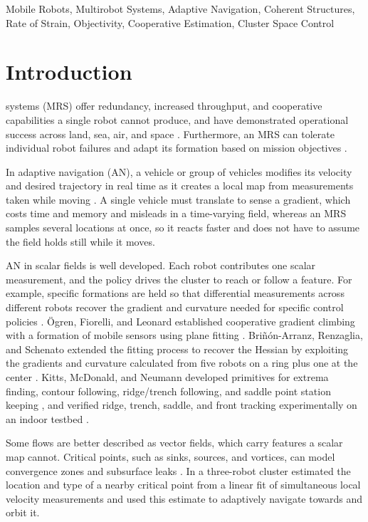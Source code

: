 \documentclass[lettersize,journal]{IEEEtran}
\begin{document}
\begin{IEEEkeywords}
Mobile Robots, Multirobot Systems, Adaptive Navigation, Coherent
Structures, Rate of Strain, Objectivity, Cooperative Estimation,
Cluster Space Control
\end{IEEEkeywords}

\section{Introduction}


 systems (MRS) offer redundancy, increased
throughput, and cooperative capabilities a single robot cannot produce,
and have demonstrated operational success across land, sea, air, and space \cite{1,2}.
Furthermore, an MRS can tolerate individual robot failures and adapt its formation based on mission objectives \cite{3,4,5}.

In adaptive
navigation (AN), a vehicle or group of vehicles modifies its velocity and desired trajectory in real time
as it creates a local map from measurements taken while moving \cite{3}. A single vehicle must translate to sense a
gradient, which costs time and memory and misleads in a time-varying field,
whereas an MRS samples several locations at once, so it reacts faster and does not have to assume the field holds still while it moves.


AN in scalar fields is well developed. Each
robot contributes one scalar measurement, and the policy drives the cluster to reach or
follow a feature. For example, specific formations are held so that differential measurements across different robots
recover the gradient and curvature needed for specific control policies
 \cite{5,6}. 
 \"{O}gren, Fiorelli, and Leonard
established cooperative gradient climbing with a formation of mobile
sensors using plane fitting \cite{6}. Bri\~{n}\'{o}n-Arranz, Renzaglia, and Schenato
extended the fitting process to recover the Hessian by exploiting the gradients and curvature calculated from five robots on a ring plus one at the
center \cite{5}. Kitts, McDonald, and
Neumann developed primitives for extrema finding, contour following,
ridge/trench following, and saddle point station keeping \cite{3}, and
verified ridge, trench, saddle, and front tracking experimentally on an
indoor testbed \cite{4,7}.

Some flows are better described as vector fields, which carry features a scalar map cannot. Critical points, such as sinks, sources, and vortices, can model convergence zones \cite{8} and subsurface leaks \cite{9}. In \cite{10} a three-robot cluster
estimated the location and type of a nearby critical point from a linear fit of
simultaneous local velocity measurements and used this estimate to adaptively navigate towards and orbit it.
\end{document}

